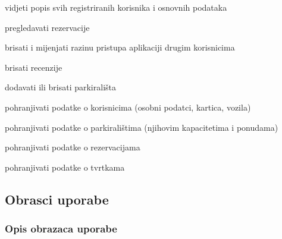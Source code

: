 \begin{packed_enum}
\begin{packed_enum}
	\end{packed_enum}
	
	\item {}
	
	\begin{packed_enum}
		
		\item vidjeti popis svih registriranih korisnika i osnovnih podataka
		\item pregledavati rezervacije
		\item brisati i mijenjati razinu pristupa aplikaciji drugim korisnicima
		\item brisati recenzije
		\item dodavati ili brisati parkirališta
		
	\end{packed_enum}
	
	\item {}
	
	\begin{packed_enum}
		
		\item pohranjivati podatke o korisnicima (osobni podatci, kartica, vozila)
		\item pohranjivati podatke o parkiralištima (njihovim kapacitetima i ponudama)
		\item pohranjivati podatke o rezervacijama
		\item pohranjivati podatke o tvrtkama
		
	\end{packed_enum}
\end{packed_enum}


\eject 



\subsection{Obrasci uporabe}

\subsubsection{Opis obrazaca uporabe}


\newcommand\showuccounter{\stepcounter{uccounter}\theuccounter}


